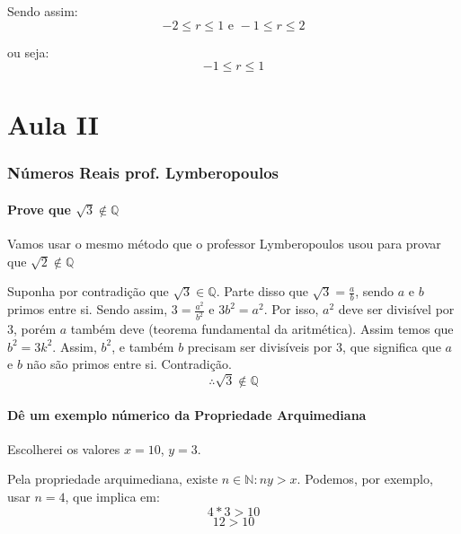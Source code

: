\documentclass[12pt]{article}
\begin{document}
Sendo assim:
\[ -2 \leq r \leq 1 \text{ e } -1 \leq r \leq 2 \]

ou seja:
\[
	\boxed{
		-1 \leq r \leq 1
	}
\]

\part*{Aula II}
\section{Números Reais prof. Lymberopoulos}
\subsection{Prove que \(\sqrt{3} \notin \mathbb{Q}\)}
Vamos usar o mesmo método que o professor Lymberopoulos usou para provar que \(\sqrt{2} \notin \mathbb{Q} \)

Suponha por contradição que \(\sqrt{3} \in \mathbb{Q}\). Parte disso que \(\sqrt{3} = \frac{a}{b}\), sendo \(a\) e \(b\) primos entre si.
Sendo assim, \(3 = \frac{a^2}{b^2}\) e \(3b^2 = a^2\). Por isso, \(a^2\) deve ser divisível por \(3\), porém \(a\) também deve (teorema fundamental da aritmética). Assim temos que \(b^2 = 3k^2\). Assim, \(b^2\), e também \(b\) precisam ser divisíveis por 3, que significa que \(a\) e \(b\) não são primos entre si. Contradição.
\[
	\boxed{
		\therefore \sqrt{3} \notin \mathbb{Q}
	}
\]
\subsection{Dê um exemplo númerico da Propriedade Arquimediana}
Escolherei os valores \( x = 10\), \(y = 3\).

Pela propriedade arquimediana, existe \(n \in \mathbb{N}: ny > x \).
Podemos, por exemplo, usar \(n = 4\), que implica em:
\[ 4*3 > 10 \]
\[ 12 > 10 \]
\end{document}
